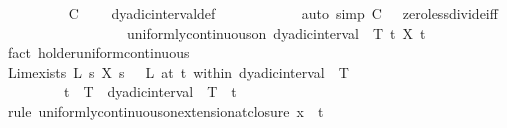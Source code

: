 \begin{isabellebody}
\ \ \ \ \ \ \ \ \isamarkupfalse%
\ {\isacartoucheopen}{\isacharquery}{\kern0pt}C\ {\isachargreater}{\kern0pt}\ {}{\isacartoucheclose}\ \isamarkupfalse%
\ dyadic{\isacharunderscore}{\kern0pt}interval{\isacharunderscore}{\kern0pt}def\isanewline
\ \ \ \ \ \ \ \ \ \ \isamarkupfalse%
\ {\isacharparenleft}{\kern0pt}auto\ simp{\isacharcolon}{\kern0pt}\ {\isacartoucheopen}{\isacharquery}{\kern0pt}C\ {\isachargreater}{\kern0pt}\ {}{\isacartoucheclose}\ zero{\isacharunderscore}{\kern0pt}less{\isacharunderscore}{\kern0pt}divide{\isacharunderscore}{\kern0pt}iff{\isacharparenright}{\kern0pt}\isanewline
\ \ \ \ \ \ \ \ \isamarkupfalse%
\isanewline
\ \ \ \ \ \ \isamarkupfalse%
\ \isamarkupfalse%
\ {\isachardoublequoteopen}uniformly{\isacharunderscore}{\kern0pt}continuous{\isacharunderscore}{\kern0pt}on\ {\isacharparenleft}{\kern0pt}dyadic{\isacharunderscore}{\kern0pt}interval\ {}\ T{\isacharparenright}{\kern0pt}\ {\isacharparenleft}{\kern0pt}{\isasymlambda}t{\isachardot}{\kern0pt}\ X\ t\ {\isasymomega}{\isacharparenright}{\kern0pt}{\isachardoublequoteclose}\isanewline
\ \ \ \ \ \ \ \ \isamarkupfalse%
\ {\isacharparenleft}{\kern0pt}fact\ holder{\isacharunderscore}{\kern0pt}uniform{\isacharunderscore}{\kern0pt}continuous{\isacharparenright}{\kern0pt}\isanewline
\ \ \ \ \ \ \isamarkupfalse%
\ \isamarkupfalse%
\ Lim{\isacharunderscore}{\kern0pt}exists{\isacharcolon}{\kern0pt}\ {\isachardoublequoteopen}{\isasymexists}L{\isachardot}{\kern0pt}\ {\isacharparenleft}{\kern0pt}{\isacharparenleft}{\kern0pt}{\isasymlambda}s{\isachardot}{\kern0pt}\ X\ s\ {\isasymomega}{\isacharparenright}{\kern0pt}\ {\isasymlonglongrightarrow}\ L{\isacharparenright}{\kern0pt}\ {\isacharparenleft}{\kern0pt}at\ t\ within\ {\isacharparenleft}{\kern0pt}dyadic{\isacharunderscore}{\kern0pt}interval\ {}\ T{\isacharparenright}{\kern0pt}{\isacharparenright}{\kern0pt}{\isachardoublequoteclose}\isanewline
\ \ \ \ \ \ \ \ \ {\isachardoublequoteopen}t\ {\isasymin}\ {\isacharbraceleft}{\kern0pt}{}{\isachardot}{\kern0pt}{\isachardot}{\kern0pt}T{\isacharbraceright}{\kern0pt}\ {\isacharminus}{\kern0pt}\ {\isacharparenleft}{\kern0pt}dyadic{\isacharunderscore}{\kern0pt}interval\ {}\ T{\isacharparenright}{\kern0pt}{\isachardoublequoteclose}\ \ t\isanewline
\ \ \ \ \ \ \ \ \isamarkupfalse%
\ {\isacharparenleft}{\kern0pt}rule\ uniformly{\isacharunderscore}{\kern0pt}continuous{\isacharunderscore}{\kern0pt}on{\isacharunderscore}{\kern0pt}extension{\isacharunderscore}{\kern0pt}at{\isacharunderscore}{\kern0pt}closure{\isacharbrackleft}{\kern0pt}\ x\ {\isacharequal}{\kern0pt}\ t{\isacharbrackright}{\kern0pt}{\isacharparenright}{\kern0pt}\isanewline

\end{isabellebody}

